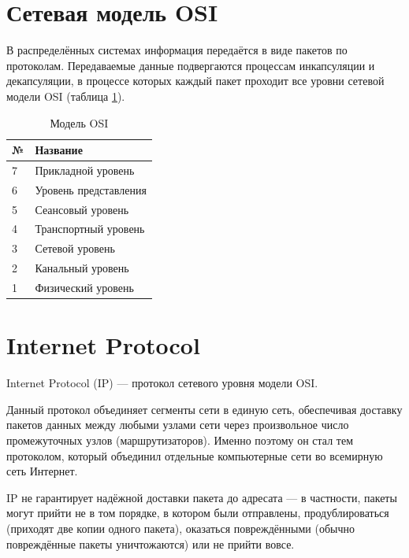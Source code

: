 \documentclass{bmstu}
\begin{document}
\section{Сетевая модель OSI}
В распределённых системах информация передаётся в виде пакетов по протоколам. Передаваемые данные подвергаются процессам инкапсуляции и декапсуляции, в процессе которых каждый пакет проходит все уровни сетевой модели OSI (таблица \ref{osi_table}).

\begin{table}[h]
	\begin{center}
		\caption{Модель OSI}
		\label{osi_table}
		\begin{tabular}{| p{1cm} | p{7cm} |}
			\hline
			\textbf{№} 	& \textbf{Название} \\
			\hline
			7 		& Прикладной уровень\\ 
			\hline
			6 		& Уровень представления  \\ 
			\hline
			5 		& Сеансовый уровень \\ 
			\hline
			4 		& Транспортный уровень \\ 
			\hline
			3 		& Сетевой уровень \\ 
			\hline
			2 		& Канальный уровень \\ 
			\hline
			1 		& Физический уровень \\ 
			\hline
		\end{tabular}
	\end{center}
\end{table}

\section*{Internet Protocol}

Internet Protocol (IP) --- протокол сетевого уровня модели OSI.

Данный протокол объединяет сегменты сети в единую сеть, обеспечивая доставку пакетов данных между любыми узлами сети через произвольное число промежуточных узлов (маршрутизаторов). Именно поэтому он стал тем протоколом, который объединил отдельные компьютерные сети во всемирную сеть Интернет. 

IP не гарантирует надёжной доставки пакета до адресата --- в частности, пакеты могут прийти не в том порядке, в котором были отправлены, продублироваться (приходят две копии одного пакета), оказаться повреждёнными (обычно повреждённые пакеты уничтожаются) или не прийти вовсе.
\end{document}
